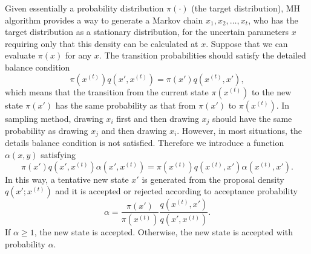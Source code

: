 Given essentially a probability distribution $\pi(\cdot)$ (the target distribution), MH algorithm provides a way to generate a Markov chain $x_1, x_2,\ldots, x_t$, who has the target distribution as a stationary distribution, for the uncertain parameters $x$ requiring only that this density can be calculated at $x$. Suppose that we can evaluate $\pi(x)$ for any $x$. The transition probabilities should satisfy the detailed balance condition
\begin{equation}
\pi\left(x^{(t)}\right)q\left(x', x^{(t)}\right) = \pi\left(x'\right)q\left(x^{(t)}, x'\right),
\end{equation}
which means that the transition from the current state $\pi(x^{(t)})$ to the new state $\pi(x')$ has the same probability as that from $\pi(x')$ to $\pi(x^{(t)})$. In sampling method, drawing $x_i$ first and then drawing $x_j$ should have the same probability as drawing $x_j$ and then drawing $x_i$. However, in most situations, the details balance condition is not satisfied. Therefore we introduce a function $\alpha(x,y)$ satisfying 
\begin{equation}
\pi\left(x'\right)q\left(x', x^{\left(t\right)}\right)\alpha\left(x',x^{\left(t\right)}\right) = \pi\left(x^{\left(t\right)}\right)q\left(x^{\left(t\right)}, x'\right)\alpha\left(x^{\left(t\right)},x'\right).
\end{equation}
In this way, a tentative new state $x'$ is generated from the proposal density $q\left(x';x^{\left(t\right)}\right)$ and it is accepted or rejected according to acceptance probability 
\begin{equation}\label{alphabalance}
\alpha=\frac{\pi\left(x'\right)}{\pi\left(x^{\left(t\right)}\right)}\frac{q\left(x^{\left(t\right)}, x'\right)}{q\left(x', x^{\left(t\right)}\right)}.
\end{equation}
If $\alpha \geq 1$, the new state is accepted. Otherwise, the new state is accepted with probability $\alpha$.

